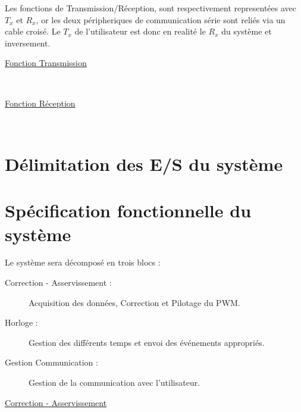 \documentclass[11pt,french]{article} %
\begin{document}
Les fonctions de Transmission/Réception, sont respectivement representées avec $T_x$ et $R_x$, or les deux péripheriques de communication série sont reliés via un cable croisé. Le $T_x$ de l'utilisateur est donc en realité le $R_x$ du système et inversement.

\begin{minipage}[t, h]{5cm}
\hspace{0.2in}
\underline{Fonction Transmission}
\end{minipage}
~
\begin{minipage}[t, h]{9cm}

\end{minipage}

\begin{minipage}[t, h]{5cm}
\hspace{0.2in}
\underline{Fonction Réception}
\end{minipage}
~
\begin{minipage}[t, h]{9cm}

\end{minipage}

\section{Délimitation des E/S du système}



\section{Spécification fonctionnelle du système}

Le système sera décomposé en trois blocs :
\vspace{0.1in}
\begin{description}
\item[Correction - Asservissement : ] Acquisition des données, Correction et Pilotage du PWM.
\item[Horloge : ] Gestion des différents temps et envoi des événements appropriés.
\item[Gestion Communication : ] Gestion de la communication avec l'utilisateur.
\end{description}

\vspace{0.2in}
\underline{Correction - Asservissement}

\begin{center}

\end{center}
\end{document}
